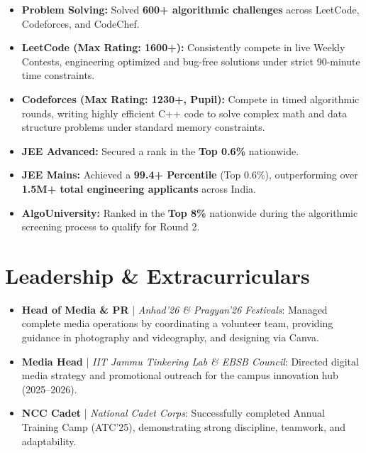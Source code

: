 \documentclass[letterpaper,11pt]{article}
\newcommand{\resumeItem}[1]{
  \item\small{
    {#1 \vspace{-2pt}}
  }
}
\newcommand{\resumeItemListStart}{\begin{itemize}[itemsep=0pt, parseitemsep=0pt]}
\newcommand{\resumeItemListEnd}{\end{itemize}\vspace{-6pt}}
\begin{document}
  \resumeItemListStart
  \resumeItem{\textbf{Problem Solving:} Solved \textbf{600+ algorithmic challenges} across LeetCode, Codeforces, and CodeChef.}
  \resumeItem{\textbf{LeetCode (Max Rating: 1600+):} Consistently compete in live Weekly Contests, engineering optimized and bug-free solutions under strict 90-minute time constraints.}
  \resumeItem{\textbf{Codeforces (Max Rating: 1230+, Pupil):} Compete in timed algorithmic rounds, writing highly efficient C++ code to solve complex math and data structure problems under standard memory constraints.}
  \item \small{\textbf{JEE Advanced:} Secured a rank in the \textbf{Top 0.6\%} nationwide.}
  \item \small{\textbf{JEE Mains:} Achieved a \textbf{99.4+ Percentile} (Top 0.6\%), outperforming over \textbf{1.5M+ total engineering applicants} across India.}
  \resumeItem{\textbf{AlgoUniversity:} Ranked in the \textbf{Top 8\%} nationwide during the algorithmic screening process to qualify for Round 2.}
\resumeItemListEnd

\section*{Leadership \& Extracurriculars}
  \resumeItemListStart
    \resumeItem{\textbf{Head of Media \& PR} | \textit{Anhad'26 \& Pragyan'26 Festivals}: Managed complete media operations by coordinating a volunteer team, providing guidance in photography and videography, and designing via Canva.}
    \resumeItem{\textbf{Media Head} | \textit{IIT Jammu Tinkering Lab \& EBSB Council}: Directed digital media strategy and promotional outreach for the campus innovation hub (2025--2026).}
    \resumeItem{\textbf{NCC Cadet} | \textit{National Cadet Corps}: Successfully completed Annual Training Camp (ATC'25), demonstrating strong discipline, teamwork, and adaptability.}
  \resumeItemListEnd
\end{document}
